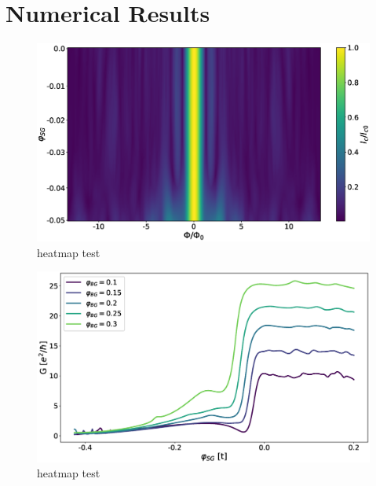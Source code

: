 \chapter{Numerical Results}
\label{ch:numerical-results}
\begin{figure}
\includegraphics[width=\textwidth]{figure/numericalmodel/qpc_icnorm_heatmap}
\caption{heatmap test}
\end{figure}

\begin{figure}
\includegraphics[width=\textwidth]{figure/numericalmodel/qpc-conductance}
\caption{heatmap test}
\end{figure}